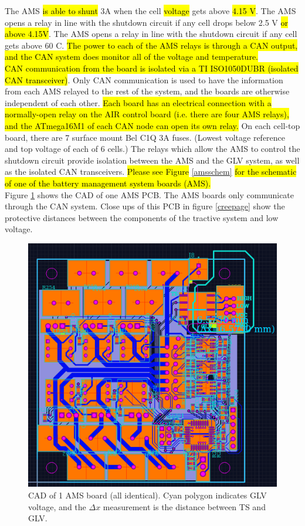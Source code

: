\documentclass{article}
\DeclareRobustCommand{\hlr}[1]{{\sethlcolor{red}\hl{#1}}}
\begin{document}
            The AMS \hlr{is able to shunt} 3A when the cell \hlr{voltage} gets above \hlr{4.15 V}. The AMS opens a relay in line with the shutdown circuit if any cell drops below 2.5 V \hlr{or above 4.15V}. The AMS opens a relay in line with the shutdown circuit if any cell gets above 60 \degree C. \hlr{The power to each of the AMS relays is through a CAN output, and the CAN system does monitor all of the voltage and temperature.}\\

            \hlr{CAN communication from the board is isolated via a TI ISO1050DUBR (isolated CAN transceiver)}. Only CAN communication is used to have the information from each AMS relayed to the rest of the system, and the boards are otherwise independent of each other. \hlr{Each board has an electrical connection with a normally-open relay on the AIR control board (i.e. there are four AMS relays), and the ATmega16M1 of each CAN node can open its own relay.} On each cell-top board, there are 7 surface mount Bel C1Q 3A fuses. (Lowest voltage reference and top voltage of each of 6 cells.) The relays which allow the AMS to control the shutdown circuit provide isolation between the AMS and the GLV system, as well as the isolated CAN transceivers. \hlr{Please see Figure} \ref{amsschem} \hlr{for the schematic of one of the battery management system boards (AMS).}\\


            Figure \ref{bmspcb} shows the CAD of one AMS PCB. The AMS boards only communicate through the CAN system. Close ups of this PCB in figure \ref{creepage} show the protective distances between the components of the tractive system and low voltage.

            \begin{figure}[H]
                \centering
                \includegraphics[width = 0.7 \textwidth]{bms_final1_PCBCAD}
                \caption{CAD of 1 AMS board (all identical). Cyan polygon indicates GLV voltage, and the $\Delta x$ measurement is the distance between TS and GLV.}
                \label{bmspcb}
            \end{figure}
\end{document}
